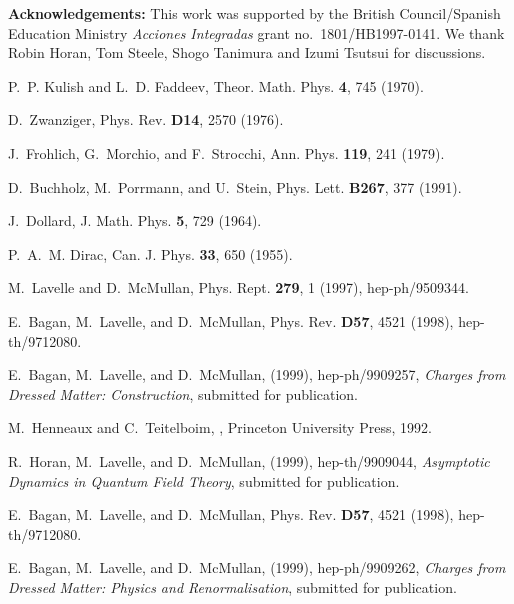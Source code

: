 \documentclass[12pt,a4paper]{article}
\providecommand{\no}{\noindent}
\begin{document}
\bigskip

\no\textbf{Acknowledgements:} This work was supported by the
British Council/Spanish Education Ministry \textit{Acciones
Integradas} grant no.\  1801/HB1997-0141. We thank Robin Horan,
Tom Steele, Shogo Tanimura and Izumi Tsutsui for discussions.



\begin{thebibliography}{10}

P.~P. Kulish and L.~D. Faddeev,
\newblock Theor. Math. Phys. {\bf 4}, 745 (1970).

D.~Zwanziger,
\newblock Phys. Rev. {\bf D14}, 2570 (1976).

J.~Frohlich, G.~Morchio, and F.~Strocchi,
\newblock Ann. Phys. {\bf 119}, 241 (1979).

D.~Buchholz, M.~Porrmann, and U.~Stein,
\newblock Phys. Lett. {\bf B267}, 377 (1991).

J.~Dollard,
\newblock J. Math. Phys. {\bf 5}, 729 (1964).

P.~A.~M. Dirac,
\newblock Can. J. Phys. {\bf 33}, 650 (1955).

M.~Lavelle and D.~McMullan,
\newblock Phys. Rept. {\bf 279}, 1 (1997), hep-ph/9509344.

E.~Bagan, M.~Lavelle, and D.~McMullan,
\newblock Phys. Rev. {\bf D57}, 4521 (1998), hep-th/9712080.

E.~Bagan, M.~Lavelle, and D.~McMullan,
\newblock (1999), hep-ph/9909257,
\newblock \textit{Charges from Dressed Matter: Construction}, submitted for publication.

M.~Henneaux and C.~Teitelboim,
, Princeton University Press,
  1992.

R.~Horan, M.~Lavelle, and D.~McMullan,
\newblock (1999), hep-th/9909044,
\newblock \textit{Asymptotic Dynamics in Quantum Field Theory}, submitted for
  publication.

E.~Bagan, M.~Lavelle, and D.~McMullan,
\newblock Phys. Rev. {\bf D57}, 4521 (1998), hep-th/9712080.

E.~Bagan, M.~Lavelle, and D.~McMullan,
\newblock (1999), hep-ph/9909262,
\newblock \textit{Charges from Dressed Matter: Physics and Renormalisation},
 submitted for publication.


\end{thebibliography}
\end{document}
